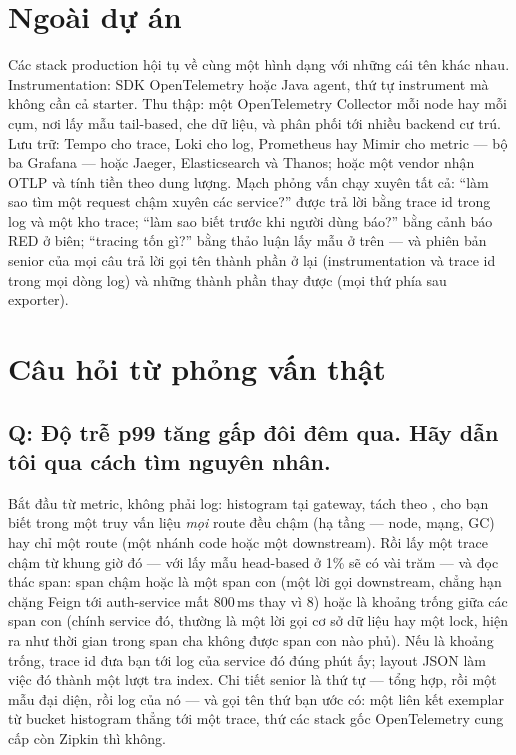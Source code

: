 \section{Ngoài dự án}

Các stack production hội tụ về cùng một hình dạng với những cái tên
khác nhau. Instrumentation: SDK OpenTelemetry hoặc Java agent, thứ tự
instrument mà không cần cả starter. Thu thập: một OpenTelemetry
Collector mỗi node hay mỗi cụm, nơi lấy mẫu tail-based, che dữ liệu,
và phân phối tới nhiều backend cư trú. Lưu trữ: Tempo cho trace, Loki
cho log, Prometheus hay Mimir cho metric --- bộ ba Grafana --- hoặc
Jaeger, Elasticsearch và Thanos; hoặc một vendor nhận OTLP và tính tiền
theo dung lượng. Mạch phỏng vấn chạy xuyên tất cả: ``làm sao tìm một
request chậm xuyên các service?'' được trả lời bằng trace id trong log
và một kho trace; ``làm sao biết trước khi người dùng báo?'' bằng cảnh
báo RED ở biên; ``tracing tốn gì?'' bằng thảo luận lấy mẫu ở trên ---
và phiên bản senior của mọi câu trả lời gọi tên thành phần ở lại
(instrumentation và trace id trong mọi dòng log) và những thành phần
thay được (mọi thứ phía sau exporter).

\section{Câu hỏi từ phỏng vấn thật}

\subsection*{Q: Độ trễ p99 tăng gấp đôi đêm qua. Hãy dẫn tôi qua cách tìm nguyên nhân.}

Bắt đầu từ metric, không phải log: histogram
 tại gateway, tách theo , cho
bạn biết trong một truy vấn liệu \emph{mọi} route đều chậm (hạ tầng
--- node, mạng, GC) hay chỉ một route (một nhánh code hoặc một
downstream). Rồi lấy một trace chậm từ khung giờ đó --- với lấy mẫu
head-based ở 1\% sẽ có vài trăm --- và đọc thác span: span chậm hoặc là
một span con (một lời gọi downstream, chẳng hạn chặng Feign tới
auth-service mất 800\,ms thay vì 8) hoặc là khoảng trống giữa các span
con (chính service đó, thường là một lời gọi cơ sở dữ liệu hay một
lock, hiện ra như thời gian trong span cha không được span con nào phủ).
Nếu là khoảng trống, trace id đưa bạn tới log của service đó đúng phút
ấy; layout JSON làm việc đó thành một lượt tra index. Chi tiết senior
là thứ tự --- tổng hợp, rồi một mẫu đại diện, rồi log của nó --- và gọi
tên thứ bạn ước có: một liên kết exemplar từ bucket histogram thẳng tới
một trace, thứ các stack gốc OpenTelemetry cung cấp còn Zipkin thì
không.

